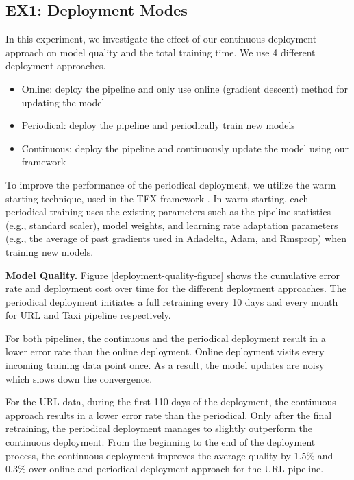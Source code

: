 \subsection{EX1: Deployment Modes}
In this experiment, we investigate the effect of our continuous deployment approach on model quality and the total training time.
We use 4 different deployment approaches.
\begin{itemize}
\item Online: deploy the pipeline and only use online (gradient descent) method for updating the model
\item Periodical: deploy the pipeline and periodically train new models 
\item Continuous: deploy the pipeline and continuously update the model using our framework
\end{itemize}

To improve the performance of the periodical deployment, we utilize the warm starting technique, used in the TFX framework \cite{baylor2017tfx}.
In warm starting, each periodical training uses the existing parameters such as the pipeline statistics (e.g., standard scaler), model weights, and learning rate adaptation parameters (e.g., the average of past gradients used in Adadelta, Adam, and Rmsprop) when training new models.

\textbf{Model Quality. }
Figure \ref{deployment-quality-figure} shows the cumulative error rate and deployment cost over time for the different deployment approaches.
The periodical deployment initiates a full retraining every 10 days and every month for URL and Taxi pipeline respectively.

For both pipelines, the continuous and the periodical deployment result in a lower error rate than the online deployment.
Online deployment visits every incoming training data point once.
As a result, the model updates are noisy which slows down the convergence.

For the URL data, during the first 110 days of the deployment, the continuous approach results in a lower error rate than the periodical.
Only after the final retraining, the periodical deployment manages to slightly outperform the continuous deployment.
From the beginning to the end of the deployment process, the continuous deployment improves the average quality by 1.5\% and 0.3\% over online and periodical deployment approach for the URL pipeline.

